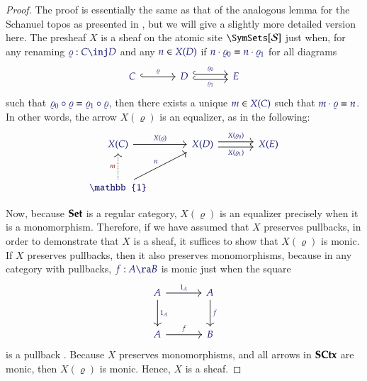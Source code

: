 \documentclass[11pt]{article}
\theoremstyle{definition}
\theoremstyle{remark}
\numberwithin{equation}{section}
\newcommand\SCtxSite{\SymSets[\Sorts]}
\begin{document}
\begin{proof}

  The proof is essentially the same as that of the analogous lemma for the
  Schanuel topos as presented in \cite[A.2.1.11.h]{johnstone:2002}, but we will
  give a slightly more detailed version here. The presheaf $X$ is a sheaf on the
  atomic site $\SCtxSite$ just when, for any renaming
  $\Of{\varrho}{C\inj D}$ and any $\Member{n}{X(D)}$ if
  $\IsEq{n\cdot \varrho_0}{n\cdot \varrho_1}$ for all diagrams
  \[
    \begin{tikzcd}[sep=large]
      \IMode{C} \arrow[r, hook, "\IMode{\varrho}"] &
      \IMode{D}
        \arrow[r, hook, shift left, "\IMode{\varrho_0}"]
        \arrow[r, hook, swap, shift right, "\IMode{\varrho_1}"]
      &
      \IMode{E}
    \end{tikzcd}
  \]
  such that $\IsEq{\varrho_0\circ\varrho}{\varrho_1\circ\varrho}$, then there
  exists a unique $\Member{m}{X(C)}$ such that $\IsEq{m\cdot\varrho}{n}$. In other
  words, the arrow $X(\varrho)$ is an equalizer, as in the following:
  \[
    \begin{tikzcd}[sep=large]
      \IMode{X(C)} \arrow[r, "\IMode{X(\varrho)}"] &
      \IMode{X(D)}
        \arrow[r, shift left, "\IMode{X(\varrho_0)}"]
        \arrow[r, swap, shift right, "\IMode{X(\varrho_1)}"]&
      \IMode{X(E)}
      \\
      \IMode{\mathbb{1}}
        \arrow[u, densely dotted, "\OMode{m}"]
        \arrow[ur, "\IMode{n}"]
    \end{tikzcd}
  \]

  Now, because $\mathbf{Set}$ is a regular category, $X(\varrho)$ is an equalizer
  precisely when it is a monomorphism. Therefore, if we have assumed that $X$
  preserves pullbacks, in order to demonstrate that $X$ is a sheaf, it suffices
  to show that $X(\varrho)$ is monic. If $X$ preserves pullbacks, then it also
  preserves monomorphisms, because in any category with pullbacks, $\Of{f}{A\ra
  B}$ is monic just when the square
  \[
    \begin{tikzcd}[sep=large]
      \IMode{A}
        \arrow[r, "\IMode{\ArrId{A}}"]
        \arrow[d, "\IMode{\ArrId{A}}"] &
      \IMode{A} \arrow[d, "\IMode{f}"]\\
      \IMode{A} \arrow[r, "\IMode{f}"] &
      \IMode{B}
    \end{tikzcd}
  \]
  is a pullback \cite[p.\ 16]{mac-lane-moerdijk:1992}. Because $X$ preserves
  monomorphisms, and all arrows in $\mathbf{SCtx}$ are monic, then $X(\varrho)$ is
  monic. Hence, $X$ is a sheaf.


\end{proof}
\end{document}
